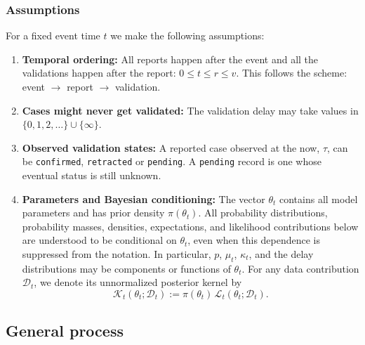 \documentclass{article}
\theoremstyle{definition}
\theoremstyle{remark}
\begin{document}
\subsubsection{Assumptions}
For a fixed event time $t$ we make the following assumptions:
\begin{enumerate}    
    \item \textbf{Temporal ordering:} 
    All reports happen after the event and all the validations happen after the report: $0 \leq t \leq r \leq v$. This follows the scheme: event $\to$ report $\to$ validation.   
    \item \textbf{Cases might never get validated:} The validation delay may take values in $\{0,1,2,\dots\} \cup \{\infty\}$.
    \item \textbf{Observed validation states:} A reported case observed at the now, $\tau$, can be \texttt{confirmed}, \texttt{retracted} or \texttt{pending}. A \texttt{pending} record is one whose eventual status is still unknown.
    \item \textbf{Parameters and Bayesian conditioning:} The vector $\theta_t$ contains all model parameters and has prior density $\pi(\theta_t)$. All probability distributions, probability masses, densities, expectations, and likelihood contributions below are understood to be conditional on $\theta_t$, even when this dependence is suppressed from the notation. In particular, $p$, $\mu_t$, $\kappa_t$, and the delay distributions may be components or functions of $\theta_t$. For any data contribution $\mathcal D_t$, we denote its unnormalized posterior kernel by
    \begin{equation}
        \mathcal K_t(\theta_t;\mathcal D_t)
        :=
        \pi(\theta_t)\,\mathcal L_t(\theta_t;\mathcal D_t).
    \end{equation}
\end{enumerate}


\subsection{General process}
\end{document}
